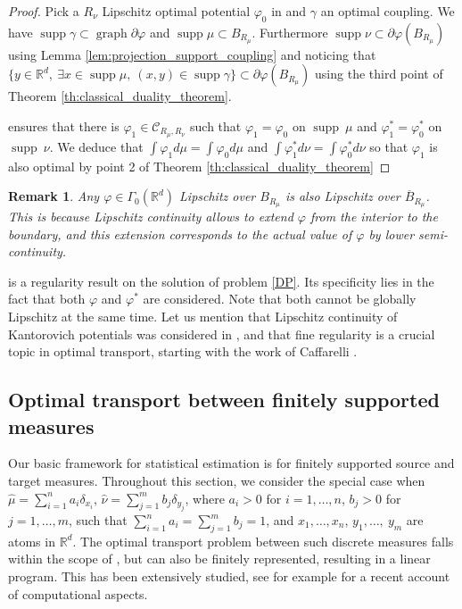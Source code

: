 \documentclass[11pt]{article}
\newtheorem{remark}[lemma]{Remark}
\DeclareMathOperator{\supp}{supp}
\DeclareMathOperator{\graph}{graph}
\newcommand{\R}{\mathbb R}
\newcommand{\1}{\mathbbm{1}}
\numberwithin{equation}{section}
\begin{document}
\begin{proof}
    Pick a $R_\nu$ Lipschitz optimal potential $\varphi_0$ in  and $\gamma$ an optimal coupling.
    We have $\supp \gamma \subset \graph \partial \varphi$ and $\supp \mu \subset B_{R_\mu}$. Furthermore $\supp \nu \subset \partial \varphi(B_{R_\mu})$ using Lemma \ref{lem:projection_support_coupling} and noticing that $\{y\in\R^d,\:\exists x\in \supp \mu,\:(x,y)\in \supp \gamma \}\subset \partial \varphi(B_{R_\mu})$ using  the third point of Theorem \ref{th:classical_duality_theorem}.
    
     ensures that there is $\varphi_1 \in \mathcal{C}_{R_\mu,R_\nu}$ such that $\varphi_1 = \varphi_0$ on $\supp \ \mu$ and $\varphi_1^* = \varphi_0^*$ on $\supp \ \nu$. We deduce that $\int \varphi_1 d\mu = \int \varphi_0 d\mu$ and $\int \varphi_1^* d\nu = \int \varphi_0^* d\nu$ so that $\varphi_1$ is also optimal by point 2 of Theorem \ref{th:classical_duality_theorem}
\end{proof}

\begin{remark}
    Any $\varphi \in \Gamma_0(\R^d)$ Lipschitz over $B_{R_\mu}$ is also Lipschitz over $\overline{B}_{R_\mu}$. This is because Lipschitz continuity allows to extend $\varphi$ from the interior to the boundary, and this extension corresponds to the actual value of $\varphi$ by lower semi-continuity. 
    \label{rem:extension_lipschitz_border}
\end{remark}

 is a regularity result on the solution of problem \eqref{DP}. Its specificity lies in the fact that both $\varphi$ and $\varphi^*$ are considered. Note that both cannot be globally Lipschitz at the same time. Let us mention that Lipschitz continuity of Kantorovich potentials was considered in \cite{mccann2001polar}, and that fine regularity is a crucial topic in optimal transport, starting with the work of Caffarelli \cite{caffarelli1992boundary,caffarelli1992regularity,caffarelli1996boundary}.



\subsection{Optimal transport between finitely supported measures}

Our basic framework for statistical estimation is for finitely supported source and target measures. Throughout this section, we consider the special case when $\hat\mu=\sum_{i=1}^na_i\delta_{x_i}$, $\hat\nu=\sum_{j=1}^mb_j\delta_{y_j}$, where $a_i> 0$ for $i=1, \ldots, n$, $b_j>0$ for $j=1,\ldots, m$, such that $\sum_{i=1}^na_i= \sum_{j=1}^mb_j=1$, and $x_1,\ldots,x_n$, $y_1,\ldots,\:y_m$ are atoms in $\R^d$. 
The optimal transport problem between such discrete measures falls within the scope of , but can also be finitely represented, resulting in a linear program. This has been extensively studied, see for example \cite{peyre2019computational} for a recent account of computational aspects.
    
\end{document}
